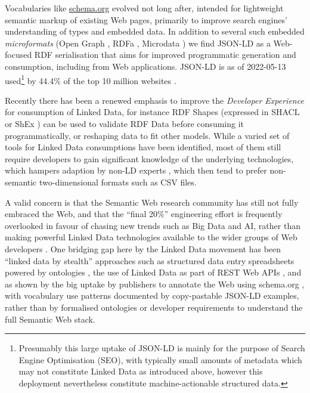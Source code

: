 Vocabularies like \href{https://schema.org/}{schema.org} evolved not long after, intended for lightweight semantic markup of existing Web pages, primarily to improve search engines' understanding of types and embedded data. In addition to several such embedded \emph{microformats} (Open Graph \cite{OpenGraphProtocol}, RDFa \cite{w3-rdfa-primer}, Microdata \cite{HTMLStandard}) we find JSON-LD \cite{w3-json-ld} as a Web-focused RDF serialisation that aims for improved programmatic generation and consumption, including from Web applications. JSON-LD is as of 2022-05-13 used\footnote{Presumably this large uptake of JSON-LD is mainly for the purpose of Search Engine Optimisation (SEO), with typically small amounts of metadata which may not constitute Linked Data as introduced above, however this deployment nevertheless constitute machine-actionable structured data.} by 44.4\% of the top 10 million websites \cite{UsageStatisticsJSONLD}.

Recently there has been a renewed emphasis to improve the \emph{Developer Experience} \cite{DesigningLinkedData2018} for consumption of Linked Data, for instance RDF Shapes (expressed in SHACL \cite{w3-shacl} or ShEx \cite{ShapeExpressionsShEx}) can be used to validate RDF Data \cite{gayoValidatingRDFData2017a,thorntonUsingShapeExpressions2019a} before consuming it programmatically, or reshaping data to fit other models. While a varied set of tools for Linked Data consumptions have been identified, most of them still require developers to gain significant knowledge of the underlying technologies, which hampers adaption by non-LD experts \cite{klimekSurveyToolsLinked2019a}, which then tend to prefer non-semantic two-dimensional formats such as CSV files.

A valid concern is that the Semantic Web research community has still not fully embraced the Web, and that the ``final 20\%'' engineering effort is frequently overlooked in favour of chasing new trends such as Big Data and AI, rather than making powerful Linked Data technologies available to the wider groups of Web developers \cite{verborghSemanticWebIdentity2020a}. One bridging gap here by the Linked Data movement has been ``linked data by stealth'' approaches such as structured data entry spreadsheets powered by ontologies \cite{wolstencroftRightFieldEmbeddingOntology2011b}, the use of Linked Data as part of REST Web APIs \cite{pageRESTLinkedData2011}, and as shown by the big uptake by publishers to annotate the Web using schema.org \cite{bernsteinNewLookSemantic2016a}, with vocabulary use patterns documented by copy-pastable JSON-LD examples, rather than by formalised ontologies or developer requirements to understand the full Semantic Web stack.




